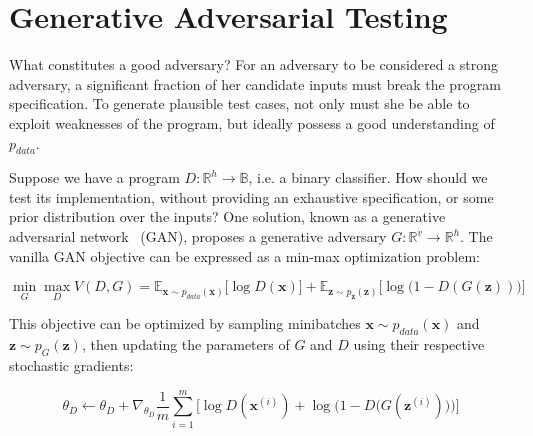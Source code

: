 
\section{Generative Adversarial Testing}

What constitutes a good adversary? For an adversary to be considered a strong adversary, a significant fraction of her candidate inputs must break the program specification. To generate plausible test cases, not only must she be able to exploit weaknesses of the program, but ideally possess a good understanding of $p_{data}$.

Suppose we have a program $D: \mathbb{R}^h\rightarrow\mathbb{B}$, i.e. a binary classifier. How should we test its implementation, without providing an exhaustive specification, or some prior distribution over the inputs? One solution, known as a generative adversarial network~\citep{goodfellow2014gan} (GAN), proposes a generative adversary $G: \mathbb{R}^v\rightarrow\mathbb{R}^h$. The vanilla GAN objective can be expressed as a min-max optimization problem:

\begin{equation}
\min_G \max_D V(D, G) = \mathbb{E}_{\mathbf x \sim p_{data}(\mathbf x)}\big[\log D(\mathbf x)\big] + \mathbb{E}_{\mathbf z \sim p_{\mathbf z}(\mathbf z)}\big[\log\big(1 - D(G(\mathbf z))\big)\big]
\end{equation}

This objective can be optimized by sampling minibatches $\mathbf x \sim p_{data}(\mathbf x)$ and $\mathbf z \sim p_{G}(\mathbf z)$, then updating the parameters of $G$ and $D$ using their respective stochastic gradients:

\begin{equation}
\theta_D \leftarrow \theta_D + \nabla_{\theta_D}\frac{1}{m}\sum_{i=1}^m\Big[\log D(\mathbf x^{(i)}) + \log\Big(1 - D\big(G(\mathbf z^{(i)})\big)\Big)\Big]
\end{equation}

